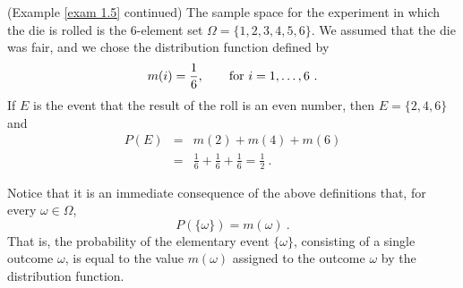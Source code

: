 \begin{example}\label{1.8}(Example \ref{exam 1.5} continued)
The sample space for the experiment in which the die is rolled is the
6-element
set $\Omega = \{1,2,3,4,5,6\}$.  We assumed that the die was fair, and we chose the
distribution function defined by
$$
m(i) = \frac16, \qquad {\rm{for}}\,\, i = 1, \dots, 6\ .
$$
If $E$ is the event that the result of the roll is an even number, then $E =
\{2,4,6\}$ and
\begin{eqnarray*}
P(E) &=& m(2) + m(4) + m(6) \\
     &=& \frac16 + \frac16 + \frac16 = \frac12\ .
\end{eqnarray*}
\end{example}
\par
Notice that it is an immediate consequence of the above definitions that, for
every $\omega \in \Omega$,
$$
P(\{\omega\}) = m(\omega)\ .
$$
That is, the probability of the elementary event $\{\omega\}$, consisting of
a single outcome $\omega$, is equal to the value $m(\omega)$ assigned to the
outcome $\omega$ by the distribution function.
 
